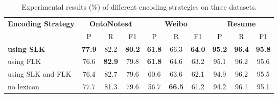 \documentclass[conference]{IEEEtran}
\begin{document}
    
    
    \begin{table*}[htbp]
            \caption{Experimental results (\%) of different encoding strategies on three datasets.}\label{result2}
\centering
\begin{tabular} {|l|
                c|c|c|
                c|c|c|
                c|c|c|
}
            \hline
            \multicolumn{1}{|c|}{\multirow{2}{*}{\textbf{Encoding Strategy}}} 
            & \multicolumn{3}{|c|}{\textbf{OntoNotes4}}  
            & \multicolumn{3}{|c|}{\textbf{Weibo}}  
            &\multicolumn{3}{|c|}{\textbf{Resume}}       
\\
            \cline{2-10}
            \multicolumn{1}{|c|}{}  
            & \multicolumn{1}{|c|}{ P }  & \multicolumn{1}{|c|}{ R } & \multicolumn{1}{|c|}{ F1 } 
            & \multicolumn{1}{|c|}{ P } & \multicolumn{1}{|c|}{ R } & \multicolumn{1}{|c|}{ F1 } 
            & \multicolumn{1}{|c|}{ P } & \multicolumn{1}{|c|}{ R } & \multicolumn{1}{|c|}{ F1 } 
\\
            \hline
            \textbf{using SLK} 
                & \textbf{ 77.9 } 	  &82.2 	&\textbf{ 80.2 }
                & \textbf{ 61.8 }     &66.3 	&\textbf{ 64.0 }
                & \textbf{ 95.2 }     &\textbf{ 96.4 } 	&\textbf{ 95.8 }  
\\
            using FLK
                &76.6 	       &\textbf{ 82.9 } 	&79.8 
                &\textbf{ 61.8 } &	64.6 	&63.2 
                &95.1 	       &96.2 	&95.6   
\\
            {using SLK and FLK} 
                & 76.4  	  &82.7 	&79.6
                & 60.6 &63.6&62.1
                &94.9 & 96.2 &95.5  
\\
            no lexicon
                &77.7 	&81.3 	&79.6 
                &56.7 	&\textbf{ 66.5 } 	&61.2 
                & 94.2 	&96.1 	&95.1
\\
            \hline
            \end{tabular}
\end{table*}
        
\end{document}
